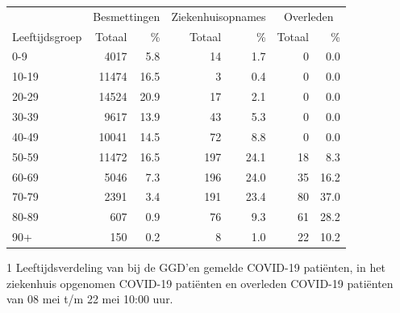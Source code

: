 \documentclass[
  english,
  man,floatsintext]{apa6}
\begin{document}
\begin{table}
\centering\begingroup\fontsize{11}{13}\selectfont

\begin{threeparttable}
\begin{tabular}{lrrrrrr}
\toprule
\multicolumn{1}{c}{ } & \multicolumn{2}{c}{Besmettingen} & \multicolumn{2}{c}{Ziekenhuisopnames} & \multicolumn{2}{c}{Overleden} \\
\cmidrule(l{3pt}r{3pt}){2-3} \cmidrule(l{3pt}r{3pt}){4-5} \cmidrule(l{3pt}r{3pt}){6-7}
Leeftijdsgroep & Totaal & \% & Totaal & \% & Totaal & \%\\
\midrule
0-9 & 4017 & 5.8 & 14 & 1.7 & 0 & 0.0\\
10-19 & 11474 & 16.5 & 3 & 0.4 & 0 & 0.0\\
20-29 & 14524 & 20.9 & 17 & 2.1 & 0 & 0.0\\
30-39 & 9617 & 13.9 & 43 & 5.3 & 0 & 0.0\\
40-49 & 10041 & 14.5 & 72 & 8.8 & 0 & 0.0\\
50-59 & 11472 & 16.5 & 197 & 24.1 & 18 & 8.3\\
60-69 & 5046 & 7.3 & 196 & 24.0 & 35 & 16.2\\
70-79 & 2391 & 3.4 & 191 & 23.4 & 80 & 37.0\\
80-89 & 607 & 0.9 & 76 & 9.3 & 61 & 28.2\\
90+ & 150 & 0.2 & 8 & 1.0 & 22 & 10.2\\
\bottomrule
\end{tabular}
\begin{tablenotes}
\item[1] Leeftijdsverdeling van bij de GGD’en gemelde COVID-19 patiënten, in het ziekenhuis opgenomen COVID-19 patiënten en overleden COVID-19 patiënten van 08 mei t/m 22 mei 10:00 uur.
\end{tablenotes}
\end{threeparttable}
\endgroup{}
\end{table}

\newpage
\end{document}
